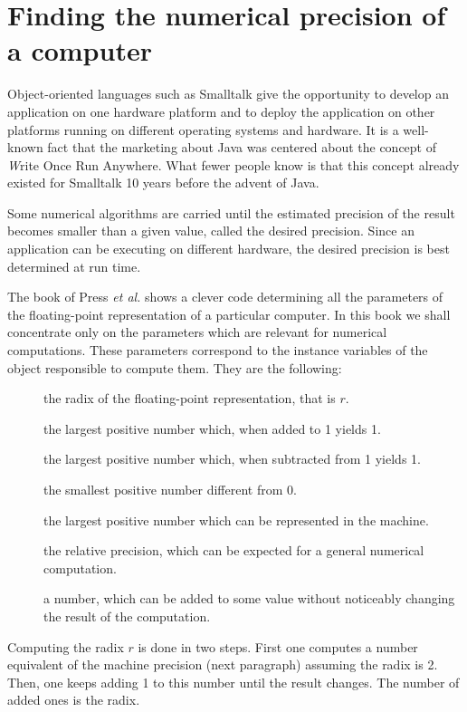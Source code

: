 \section{Finding the numerical precision of a computer}
\label{sec:findprecision}
Object-oriented languages such as Smalltalk give the
opportunity to develop an application on one hardware platform and
to deploy the application on other platforms running on different
operating systems and hardware.
It is a well-known fact that the
marketing about Java was centered about the concept of {\textsl Write
Once Run Anywhere}.
What fewer people know is that this concept
already existed for Smalltalk 10 years before the advent of Java.

Some numerical algorithms are carried until the estimated
precision of the result becomes smaller than a given value, called
the desired precision. Since an application can be executing on
different hardware, the desired precision is best determined at
run time.

The book of Press \textit{et al.} \cite{Press} shows a clever code
determining all the parameters of the floating-point
representation of a particular computer. In this book we shall
concentrate only on the parameters which are relevant for
numerical computations. These parameters correspond to the
instance variables of the object responsible to compute them. They
are the following:
\begin{description}
\item[] the radix of the floating-point representation, that is $r$.
\item[] the largest positive number which, when added to 1 yields 1.
\item[] the largest positive number which, when subtracted from 1 yields 1.
\item[] the smallest positive number different from 0.
\item[] the largest positive number which can be represented in the machine.
\item[] the relative precision, which can be expected for a general numerical computation.
\item[] a number, which can be added to some value without noticeably changing the result of the computation.
\end{description}
Computing the radix $r$ is done in two steps. First one computes a
number equivalent of the machine precision (\cf next paragraph)
assuming the radix is 2. Then, one keeps adding 1 to this number
until the result changes. The number of added ones is the radix.

